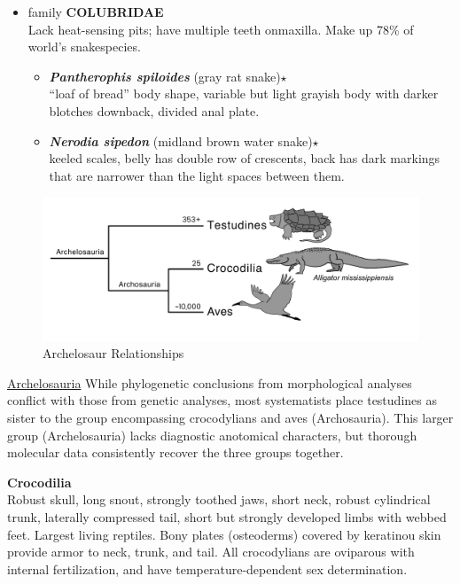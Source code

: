 \documentclass[a4paper,12pt]{article}
\begin{document}
\begin{description}
\begin{itemize}
\begin{itemize}
\begin{itemize}
    \end{itemize}
    \item family {\textbf{COLUBRIDAE}} \\ Lack heat-sensing pits; have multiple teeth onmaxilla. Make up 78\% of world’s snakespecies.
    \begin{itemize}
      \item{\textbf{\textit{Pantherophis spiloides}} (gray rat snake)$\star$} \\ ``loaf of bread'' body shape, variable but light grayish body with darker blotches downback, divided anal plate.
      \item{\textbf{\textit{Nerodia sipedon}} (midland brown water snake)$\star$} \\ keeled scales, belly has double row of crescents, back has dark markings that are narrower than the light spaces between them.
    \end{itemize}
  \end{itemize}
\end{itemize}

\begin{figure}[H]
\centering
  \includegraphics[scale=0.3]{Archelosauria_tre.pdf}
  \caption{Archelosaur Relationships}
  \label{fig:Archelosauria}
\end{figure}


\item{\underline{{\LARGE{Archelosauria}}}}
While phylogenetic conclusions from morphological analyses conflict with those from genetic analyses, most systematists place testudines as sister to the group encompassing crocodylians and aves (Archosauria). This larger group (Archelosauria) lacks diagnostic anotomical characters, but thorough molecular data consistently recover the three groups together.

\item\textbf{Crocodilia} \\ Robust skull, long snout, strongly toothed jaws, short neck, robust cylindrical trunk, laterally compressed tail, short but strongly developed limbs with webbed feet. Largest living reptiles. Bony plates (osteoderms) covered by keratinou skin provide armor to neck, trunk, and tail. All crocodylians are oviparous with internal fertilization, and have temperature-dependent sex determination. 


\end{description}
\end{document}
